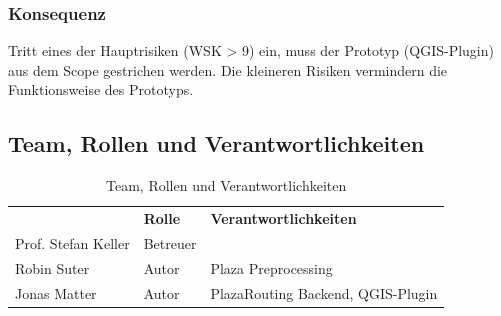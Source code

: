 \subsubsection{Konsequenz}
\label{Risiken:Konsequenz}
Tritt eines der Hauptrisiken (WSK > 9) ein, muss der Prototyp (QGIS-Plugin) aus dem Scope gestrichen werden. Die kleineren Risiken vermindern die Funktionsweise des Prototyps.

\subsection{Team, Rollen und Verantwortlichkeiten}
\label{sub:Team, Rollen und Verantwortlichkeiten}

\begin{table}[H]
    \centering
    \caption{Team, Rollen und Verantwortlichkeiten}
    \label{table: Team, Rollen und Verantwortlichkeiten}
    \begin{tabular}{lll}
        & \textbf{Rolle} & \textbf{Verantwortlichkeiten}    \\
        Prof. Stefan Keller  &        Betreuer                   &    \\
        Robin Suter          &        Autor                      & Plaza Preprocessing \\
        Jonas Matter         &        Autor                      & PlazaRouting Backend, QGIS-Plugin
    \end{tabular}
\end{table}